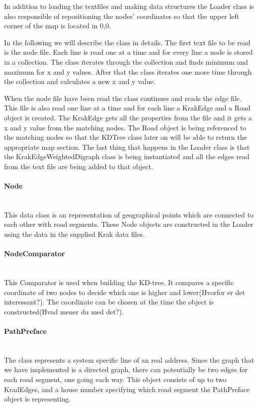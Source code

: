 \documentclass[a4paper,10pt,titlepage]{article}
\begin{document}
In addition to loading the textfiles and making data structures the Loader class is also responsible of repositioning the nodes' coordinates so that the upper left corner of the map is located in 0,0.

In the following we will describe the class in details. The first text file to be read is the node file. Each line is read one at a time and for every line a node is stored in a collection. The class iterates through the collection and finds minimum and maximum for x and y values. After that the class iterates one more time through the collection and calculates a new x and y value.  

When the node file have been read the class continues and reads the edge file. This file is also read one line at a time and for each line a KrakEdge and a Road object is created. The KrakEdge gets all the properties from the file and it gets a x and y value from the matching nodes. The Road object is being referenced to the matching nodes so that the KDTree class later on will be able to return the appropriate map section. The last thing that happens in the Loader class is that the KrakEdgeWeightedDigraph class is being instantiated and all the edges read from the text file are being added to that object. 

				\paragraph{Node}\mbox{}\\				
				This data class is an representation of geographical points which are connected to each other with road segments. These Node objects are constructed in the Loader using the data in the supplied Krak data files. 
				
				\paragraph{NodeComparator}\mbox{}\\				
This Comparator is used when building the KD-tree. It compares a specific coordinate of two nodes to decide which one is higher and lower(Hvorfor er det interessant?). The coordinate can be chosen at the time the object is constructed(Hvad mener du med det?).

				\paragraph{PathPreface}\mbox{}\\				
The class represents a system specific line of an real address. Since the graph that we have implemented is a directed graph, there can potentially be two edges for each road segment, one going each way. This object consists of up to two KradEdges, and a house number specifying which road segment the PathPreface object is representing.
\end{document}
